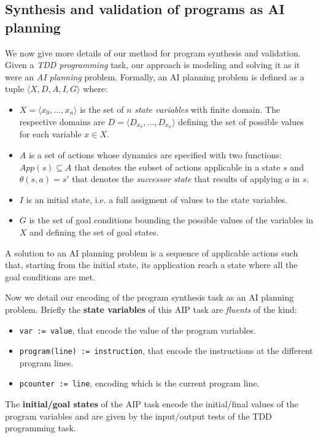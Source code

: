 \documentclass[10pt,a4paper]{paper}
\newcommand{\tup}[1]{{\langle #1 \rangle}}
\begin{document}
\subsection{Synthesis and validation of programs as AI planning}
We now give more details of our method for program synthesis and validation. Given a {\em TDD programming} task, our approach is modeling and solving it as it were an {\em AI planning} problem. Formally, an AI planning problem is defined as a tuple $\tup{X,D,A,I,G}$ where:
\begin{itemize}
\item $X=\tup{x_0, \ldots, x_n}$ is the set of $n$ {\em state variables} with finite domain. The respective domains are $D=\tup{D_{x_0}, \ldots, D_{x_n}}$ defining the set of possible values for each variable $x\in X$.
\item $A$ is a set of actions whose dynamics are specified with two functions: $App(s)\subseteq A$ that denotes the subset of actions applicable in a state $s$ and $\theta(s,a)=s'$ that denotes the {\em successor state} that results of applying $a$ in $s$.
\item $I$ is an initial state, i.e. a full assigment of values to the state variables.
\item $G$ is the set of goal conditions bounding the possible values of the variables in $X$ and defining the set of goal states.  
\end{itemize}
A solution to an AI planning problem is a sequence of applicable actions such that, starting from the initial state, its application reach a state where all the goal conditions are met.

Now we detail our encoding of the program synthesis task as an AI planning problem. Briefly the {\bf state variables} of this AIP task are {\em fluents} of the kind:
\begin{itemize}
\item {\tt var := value}, that encode the value of the program variables.
\item {\tt program(line) := instruction}, that encode the instructions at the different program lines.
\item {\tt pcounter := line}, encoding which is the current program line.
\end {itemize}

The {\bf initial/goal states} of the AIP task encode the initial/final values of the program variables and are given by the input/output tests of the TDD programming task.
\end{document}
